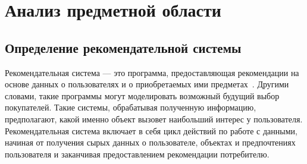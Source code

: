 \chapter{Анализ предметной области}


\section{Определение рекомендательной системы}

Рекомендательная система — это программа, предоставляющая рекомендации на основе данных о пользователях
и о приобретаемых ими предметах~\cite{def_rec}. Другими словами, такие программы могут моделировать возможный будущий
выбор покупателей. Такие системы, обрабатывая полученную информацию, предполагают, какой именно
объект вызовет наибольший интерес у пользователя. Рекомендательная система включает в себя цикл действий по работе с
данными, начиная от получения сырых данных о пользователе, объектах и предпочтениях пользователя и заканчивая
предоставлением рекомендации потребителю.


